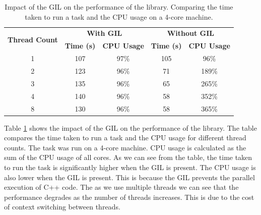 \begin{spacing}{1.2}
    \begin{table}
        \centering
        \begin{tabular}{|c|c|c|c|c|}
            \hline
            \multirow{2}{*}{\textbf{Thread Count}} & \multicolumn{2}{c|}{\textbf{With GIL}} & \multicolumn{2}{c|}{\textbf{Without GIL}}                                          \\
                                                   & \textbf{Time (s)}                      & \textbf{CPU Usage}                        & \textbf{Time (s)} & \textbf{CPU Usage} \\
            \hline
            1                                      & 107                                    & 97\%                                      & 105               & 96\%               \\
            2                                      & 123                                    & 96\%                                      & 71                & 189\%              \\
            3                                      & 135                                    & 96\%                                      & 65                & 265\%              \\
            4                                      & 140                                    & 96\%                                      & 58                & 352\%              \\
            8                                      & 130                                    & 96\%                                      & 58                & 365\%              \\
            \hline
        \end{tabular}
        \caption{Impact of the GIL on the performance of the library. Comparing the time taken to run a task and the CPU usage
            on a 4-core machine.}
        \label{tab:gil_impact}
    \end{table}


    Table \ref{tab:gil_impact} shows the impact of the GIL on the performance of the library. The table compares the time
    taken to run a task and the CPU usage for different thread counts. The task was run on a 4-core machine. CPU usage is
    calculated as the sum of the CPU usage of all cores. As we can see from the table, the time taken to run the task is
    significantly higher when the GIL is present. The CPU usage is also lower when the GIL is present. This is because
    the GIL prevents the parallel execution of C++ code. The as we use multiple threads we can see that the performance degrades
    as the number of threads increases. This is due to the cost of context switching between threads.\\


\end{spacing}

